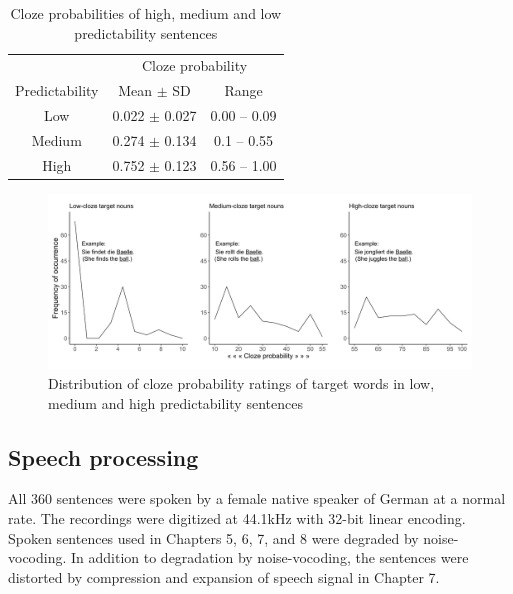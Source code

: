 \documentclass[a4paper, nobind]{templates/ociamthesis}
\begin{document}
\begin{table}[ht]
\begin{center}
\caption{Cloze probabilities of high, medium and low predictability sentences} 
\label{cloze-table} 
\vskip 0.12in
\begin{tabular}{c c c}
\toprule
 & \multicolumn{2}{c}{Cloze probability} \\
\cmidrule(l){2-3}
Predictability & Mean $\pm$ SD & Range \\
\midrule
Low & 0.022 $\pm$ 0.027 & 0.00 – 0.09 \\
Medium & 0.274 $\pm$ 0.134 & 0.1 – 0.55 \\
High & 0.752 $\pm$ 0.123 & 0.56 – 1.00 \\
\bottomrule
\end{tabular}
\end{center}
\end{table}

\begin{figure}

{\centering \includegraphics[width=0.9\linewidth]{figures/materials/cloze-distribution} 

}

\caption{Distribution of cloze probability ratings of target words in low, medium and high predictability sentences}\label{fig:cloze-distribution}
\end{figure}

\hypertarget{speech-processing}{%
\subsection{Speech processing}\label{speech-processing}}

All 360 sentences were spoken by a female native speaker of German at a normal rate.
The recordings were digitized at 44.1kHz with 32-bit linear encoding.
Spoken sentences used in Chapters 5, 6, 7, and 8 were degraded by noise-vocoding.
In addition to degradation by noise-vocoding, the sentences were distorted by compression and expansion of speech signal in Chapter 7.
\end{document}
